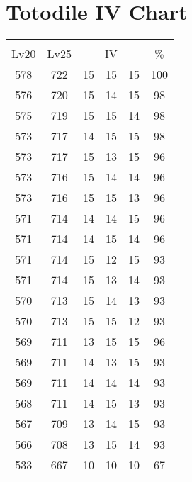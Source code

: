 \documentclass{article}%
\begin{document}
%
\normalsize%
\section{Totodile IV Chart}%
\label{sec:Totodile IV Chart}%
\renewcommand{\arraystretch}{1.5}%
\begin{tabular}{|c|c|c|c|c|c|}%
\hline%
\multicolumn{6}{|c|}{\textcolor{white}{ 
\linebreak{Totodile}
}%
\cellcolor{black}}\\%
\multicolumn{1}{|c}{Lv20}&\multicolumn{1}{c|}{Lv25}&\multicolumn{3}{c|}{IV}&\multicolumn{1}{|c|}{\%}\\%
\hline%
\rowcolor{color100}%
578&722&15&15&15&100\\%
\hline%
\rowcolor{color98}%
576&720&15&14&15&98\\%
\hline%
\rowcolor{color98}%
575&719&15&15&14&98\\%
\hline%
\rowcolor{color98}%
573&717&14&15&15&98\\%
\hline%
\rowcolor{color96}%
573&717&15&13&15&96\\%
\hline%
\rowcolor{color96}%
573&716&15&14&14&96\\%
\hline%
\rowcolor{color96}%
573&716&15&15&13&96\\%
\hline%
\rowcolor{color96}%
571&714&14&14&15&96\\%
\hline%
\rowcolor{color96}%
571&714&14&15&14&96\\%
\hline%
\rowcolor{color93}%
571&714&15&12&15&93\\%
\hline%
\rowcolor{color93}%
571&714&15&13&14&93\\%
\hline%
\rowcolor{color93}%
570&713&15&14&13&93\\%
\hline%
\rowcolor{color93}%
570&713&15&15&12&93\\%
\hline%
\rowcolor{color96}%
569&711&13&15&15&96\\%
\hline%
\rowcolor{color93}%
569&711&14&13&15&93\\%
\hline%
\rowcolor{color93}%
569&711&14&14&14&93\\%
\hline%
\rowcolor{color93}%
568&711&14&15&13&93\\%
\hline%
\rowcolor{color93}%
567&709&13&14&15&93\\%
\hline%
\rowcolor{color93}%
566&708&13&15&14&93\\%
\hline%
\rowcolor{color91}%
533&667&10&10&10&67\\%
\end{tabular}

%
\end{document}
